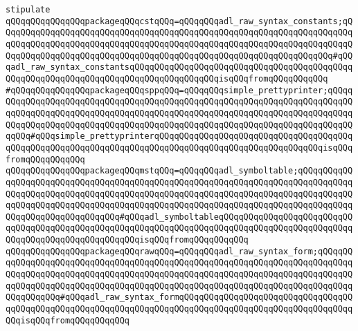 \newline
\verb|stipulate|\newline
\verb|qQQqqQQqqQQqqQQqpackageqQQqcstqQQq=qQQqqQQqadl_raw_syntax_constants;qQQqqQQqqQQqqQQqqQQqqQQqqQQqqQQqqQQqqQQqqQQqqQQqqQQqqQQqqQQqqQQqqQQqqQQqqQQqqQQqqQQqqQQqqQQqqQQqqQQqqQQqqQQqqQQqqQQqqQQqqQQqqQQqqQQqqQQqqQQqqQQqqQQqqQQqqQQqqQQqqQQqqQQqqQQqqQQqqQQqqQQqqQQqqQQqqQQqqQQqqQQqqQQq#qQQqadl_raw_syntax_constantsqQQqqQQqqQQqqQQqqQQqqQQqqQQqqQQqqQQqqQQqqQQqqQQqqQQqqQQqqQQqqQQqqQQqqQQqqQQqqQQqqQQqqQQqisqQQqfromqQQqqQQqqQQq|\newline
\verb|#qQQqqQQqqQQqqQQqpackageqQQqsppqQQq=qQQqqQQqsimple_prettyprinter;qQQqqQQqqQQqqQQqqQQqqQQqqQQqqQQqqQQqqQQqqQQqqQQqqQQqqQQqqQQqqQQqqQQqqQQqqQQqqQQqqQQqqQQqqQQqqQQqqQQqqQQqqQQqqQQqqQQqqQQqqQQqqQQqqQQqqQQqqQQqqQQqqQQqqQQqqQQqqQQqqQQqqQQqqQQqqQQqqQQqqQQqqQQqqQQqqQQqqQQqqQQqqQQqqQQqqQQqqQQq#qQQqsimple_prettyprinterqQQqqQQqqQQqqQQqqQQqqQQqqQQqqQQqqQQqqQQqqQQqqQQqqQQqqQQqqQQqqQQqqQQqqQQqqQQqqQQqqQQqqQQqqQQqqQQqqQQqqQQqisqQQqfromqQQqqQQqqQQq|\newline
\verb|qQQqqQQqqQQqqQQqpackageqQQqmstqQQq=qQQqqQQqadl_symboltable;qQQqqQQqqQQqqQQqqQQqqQQqqQQqqQQqqQQqqQQqqQQqqQQqqQQqqQQqqQQqqQQqqQQqqQQqqQQqqQQqqQQqqQQqqQQqqQQqqQQqqQQqqQQqqQQqqQQqqQQqqQQqqQQqqQQqqQQqqQQqqQQqqQQqqQQqqQQqqQQqqQQqqQQqqQQqqQQqqQQqqQQqqQQqqQQqqQQqqQQqqQQqqQQqqQQqqQQqqQQqqQQqqQQqqQQqqQQqqQQqqQQq#qQQqadl_symboltableqQQqqQQqqQQqqQQqqQQqqQQqqQQqqQQqqQQqqQQqqQQqqQQqqQQqqQQqqQQqqQQqqQQqqQQqqQQqqQQqqQQqqQQqqQQqqQQqqQQqqQQqqQQqqQQqqQQqqQQqqQQqisqQQqfromqQQqqQQqqQQq|\newline
\verb|qQQqqQQqqQQqqQQqpackageqQQqrawqQQq=qQQqqQQqadl_raw_syntax_form;qQQqqQQqqQQqqQQqqQQqqQQqqQQqqQQqqQQqqQQqqQQqqQQqqQQqqQQqqQQqqQQqqQQqqQQqqQQqqQQqqQQqqQQqqQQqqQQqqQQqqQQqqQQqqQQqqQQqqQQqqQQqqQQqqQQqqQQqqQQqqQQqqQQqqQQqqQQqqQQqqQQqqQQqqQQqqQQqqQQqqQQqqQQqqQQqqQQqqQQqqQQqqQQqqQQqqQQqqQQqqQQqqQQq#qQQqadl_raw_syntax_formqQQqqQQqqQQqqQQqqQQqqQQqqQQqqQQqqQQqqQQqqQQqqQQqqQQqqQQqqQQqqQQqqQQqqQQqqQQqqQQqqQQqqQQqqQQqqQQqqQQqqQQqqQQqisqQQqfromqQQqqQQqqQQq|\newline
